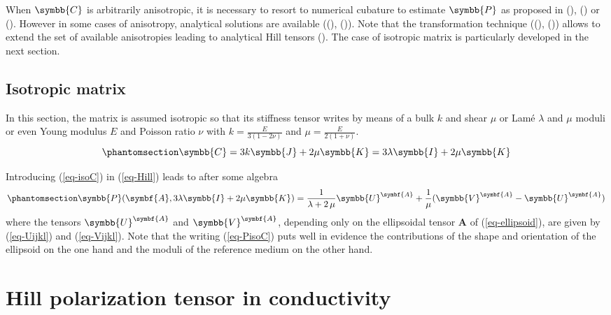 \documentclass[
  a4paper,
  numbers=noendperiod,
  DIV=12]{scrreprt}
\newcommand{\uu}[1]{{\symbf{{#1}}}}
\newcommand{\uuuu}[1]{{\symbb{{#1}}}}
\begin{document}
When \(\uuuu{C}\) is arbitrarily anisotropic, it is necessary to resort
to numerical cubature to estimate \(\uuuu{P}\) as proposed in
(),
() or
(). However in some cases of
anisotropy, analytical solutions are available
((),
()). Note that the
transformation technique ((),
()) allows to extend the
set of available anisotropies leading to analytical Hill tensors
(). The
case of isotropic matrix is particularly developed in the next section.

\subsection{Isotropic matrix}\label{isotropic-matrix-2}

In this section, the matrix is assumed isotropic so that its stiffness
tensor writes by means of a bulk \(k\) and shear \(\mu\) or Lamé
\(\lambda\) and \(\mu\) moduli or even Young modulus \(E\) and Poisson
ratio \(\nu\) with \(k=\frac{E}{3(1-2\nu)}\) and
\(\mu=\frac{E}{2(1+\nu)}\).
\begin{equation}\protect\phantomsection\label{eq-isoC}{
\uuuu{C} = 3k\uuuu{J}+2\mu\uuuu{K} =  3\lambda\uuuu{I}+2\mu\uuuu{K}
}\end{equation}

Introducing (\ref{eq-isoC}) in (\ref{eq-Hill}) leads to after some
algebra \begin{equation}\protect\phantomsection\label{eq-PisoC}{
\uuuu{P}(\uu{A},3\lambda\uuuu{I}+2\mu\uuuu{K})=
\frac{1}{\lambda+2\,\mu}
\uuuu{U}^{\uu{A}}
+\frac{1}{\mu}(\uuuu{V}^{\uu{A}}-\uuuu{U}^{\uu{A}})
}\end{equation} where the tensors \(\uuuu{U}^{\uu{A}}\) and
\(\uuuu{V}^{\uu{A}}\), depending only on the ellipsoidal tensor
\(\uu{A}\) of (\ref{eq-ellipsoid}), are given by (\ref{eq-Uijkl}) and
(\ref{eq-Vijkl}). Note that the writing (\ref{eq-PisoC}) puts well in
evidence the contributions of the shape and orientation of the ellipsoid
on the one hand and the moduli of the reference medium on the other
hand.

\section{Hill polarization tensor in
conductivity}\label{hill-polarization-tensor-in-conductivity}
\end{document}
